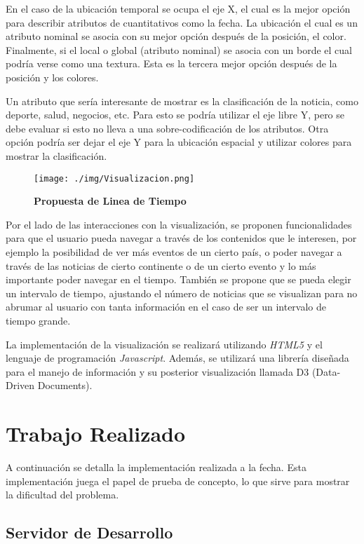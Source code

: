 \documentclass[10pt]{article}
\begin{document}
	En el caso de la ubicación temporal se ocupa el eje X, el cual es la mejor opción para describir atributos de cuantitativos como la fecha. La ubicación el cual es un atributo nominal se asocia con su mejor opción después de la posición, el color. Finalmente, si el local o global (atributo nominal) se asocia con un borde el cual podría verse como una textura. Esta es la tercera mejor opción después de la posición y los colores.
	
	Un atributo que sería interesante de mostrar es la clasificación de la noticia, como deporte, salud, negocios, etc. Para esto se podría utilizar el eje libre Y, pero se debe evaluar si esto no lleva a una sobre-codificación de los atributos. Otra opción podría ser dejar el eje Y para la ubicación espacial y utilizar colores para mostrar la clasificación.

\begin{figure}[h!]
	\centering
    \texttt{[image: ./img/Visualizacion.png]}
	\caption{\textbf{Propuesta de Linea de Tiempo}}
	\label{lineatiempo}
\end{figure}

	Por el lado de las interacciones con la visualización, se proponen funcionalidades para que el usuario pueda navegar a través de los contenidos que le interesen, por ejemplo la posibilidad de ver más eventos de un cierto país, o poder navegar a través de las noticias de cierto continente o de un cierto evento y lo más importante poder navegar en el tiempo. También se propone que se pueda elegir un intervalo de tiempo, ajustando el número de noticias que se visualizan para no abrumar al usuario con tanta información en el caso de ser un intervalo de tiempo grande.

	La implementación de la visualización se realizará utilizando \emph{HTML5} y el lenguaje de programación \emph{Javascript}. Además, se utilizará una librería diseñada para el manejo de información y su posterior visualización llamada D3 (Data-Driven Documents)\cite{d3}.

\section{Trabajo Realizado}

A continuación se detalla la implementación realizada a la fecha. Esta implementación juega el papel de prueba de concepto, lo que sirve para mostrar la dificultad del problema.

\subsection{Servidor de Desarrollo}
\end{document}
